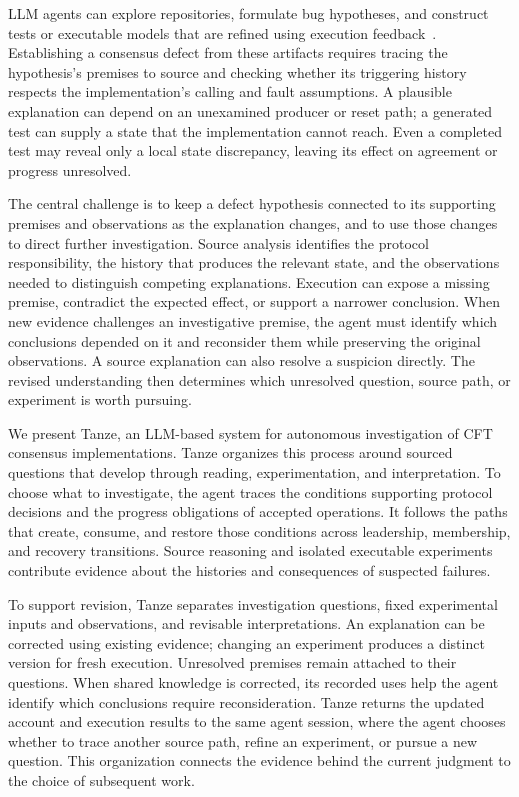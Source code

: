 \documentclass[10pt,twocolumn,letterpaper]{article}
\newcommand{\sys}{Tanze}
\begin{document}
LLM agents can explore repositories, formulate bug hypotheses, and construct tests or executable models that are refined using execution feedback~\cite{agora,specula}. Establishing a consensus defect from these artifacts requires tracing the hypothesis's premises to source and checking whether its triggering history respects the implementation's calling and fault assumptions. A plausible explanation can depend on an unexamined producer or reset path; a generated test can supply a state that the implementation cannot reach. Even a completed test may reveal only a local state discrepancy, leaving its effect on agreement or progress unresolved.

The central challenge is to keep a defect hypothesis connected to its supporting premises and observations as the explanation changes, and to use those changes to direct further investigation. Source analysis identifies the protocol responsibility, the history that produces the relevant state, and the observations needed to distinguish competing explanations. Execution can expose a missing premise, contradict the expected effect, or support a narrower conclusion. When new evidence challenges an investigative premise, the agent must identify which conclusions depended on it and reconsider them while preserving the original observations. A source explanation can also resolve a suspicion directly. The revised understanding then determines which unresolved question, source path, or experiment is worth pursuing.

We present \sys{}, an LLM-based system for autonomous investigation of CFT consensus implementations. \sys{} organizes this process around sourced questions that develop through reading, experimentation, and interpretation. To choose what to investigate, the agent traces the conditions supporting protocol decisions and the progress obligations of accepted operations. It follows the paths that create, consume, and restore those conditions across leadership, membership, and recovery transitions. Source reasoning and isolated executable experiments contribute evidence about the histories and consequences of suspected failures.

To support revision, \sys{} separates investigation questions, fixed experimental inputs and observations, and revisable interpretations. An explanation can be corrected using existing evidence; changing an experiment produces a distinct version for fresh execution. Unresolved premises remain attached to their questions. When shared knowledge is corrected, its recorded uses help the agent identify which conclusions require reconsideration. \sys{} returns the updated account and execution results to the same agent session, where the agent chooses whether to trace another source path, refine an experiment, or pursue a new question. This organization connects the evidence behind the current judgment to the choice of subsequent work.
\end{document}
